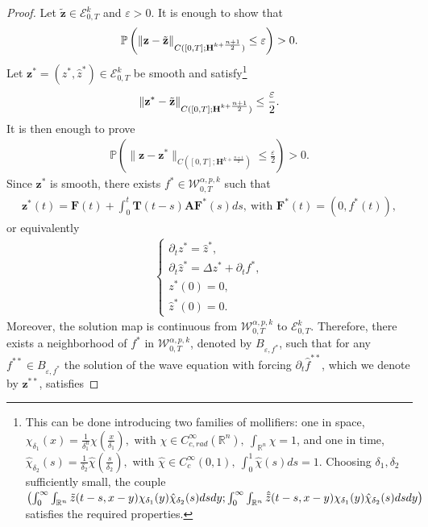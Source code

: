 \documentclass[12pt,reqno]{amsart}
\theoremstyle{plain}
\theoremstyle{remark}
\theoremstyle{plain}
\theoremstyle{definition}
\numberwithin{equation}{section}
\numberwithin{equation}{section}
\def\R{{\mathbb R}}
\newcommand{\eps}{\varepsilon}
\begin{document}
	\begin{proof}
		Let $\tilde{\mathbf{z}} \in \mathcal{E}_{0,T}^k$ and $\varepsilon > 0$. It is enough to show that
		\begin{align*}
			\mathbb{P}\left(\lVert \mathbf{z}-\Tilde{\mathbf{z}}\rVert_{C([0,T];\mathbf{H}^{k+\frac{n+1}{2}})}\leq \eps\right)>0.
		\end{align*}
		Let $\mathbf{z}^* = (z^*, \hat{z}^*) \in \mathcal{E}_{0,T}^k$ be smooth and satisfy\footnote{This can be done introducing two families of mollifiers: one in space, $\chi_{\delta_1}(x)=\frac{1}{\delta_1^n}\chi(\frac{x}{\delta_1}),$ with $ \chi\in C^{\infty}_{c,rad}(\R^n),\ \int_{\R^n}\chi=1$, and one in time, $\hat{\chi}_{\delta_2}(s)=\frac{1}{\delta_2}\hat\chi(\frac{s}{\delta_2}),$ with $\hat\chi\in C^{\infty}_c(0,1),\ \int_0^1 \hat{\chi}(s)ds=1.$ Choosing $\delta_1, \delta_2$ sufficiently small, the couple $\left(\int_0^{\infty}\int_{\R^n} \Tilde{z}(t-s,x-y)\chi_{\delta_1}(y)\hat{\chi}_{\delta_2}(s)ds dy;\int_0^{\infty}\int_{\R^n} \hat{\Tilde{z}}(t-s,x-y)\chi_{\delta_1}(y)\hat{\chi}_{\delta_2}(s)ds dy\right)$ satisfies the required properties.}
        \begin{align*}
			\lVert {\mathbf{z}}^*-\Tilde{\mathbf{z}}\rVert_{C([0,T];\mathbf{H}^{k+\frac{n+1}{2}})}\leq \frac{\eps}{2}.    
		\end{align*}
        It is then enough to prove
		\begin{align*}
			\mathbb{P}\left(\lVert \mathbf{z}-{\mathbf{z}}^*\rVert_{C([0,T];\mathbf{H}^{k+\frac{n+1}{2}})}\leq \frac{\eps}{2}\right)>0.
		\end{align*}
		Since $\mathbf{z}^*$ is smooth, there exists $f^* \in \mathcal{W}_{0,T}^{\alpha,p,k}$ such that \begin{align*}
			{\mathbf{z}}^*(t)=\mathbf{F}(t)+\int_0^t \mathbf{T}(t-s)\mathbf{A}\mathbf{F}^*(s)ds,\ \text{with } \mathbf{F}^*(t)=(0,f^*(t)),
		\end{align*} 
		or equivalently
		\begin{align*}
			\begin{cases}
				\partial_t z^*=\hat{z}^*, \\
				\partial_t \hat{z}^*= \Delta z^*+\partial_t f^*,\\
				z^*(0)=0,\\
				\hat{z}^*(0)=0.
			\end{cases}
		\end{align*}
		Moreover, the solution map is continuous from $\mathcal{W}_{0,T}^{\alpha,p,k}$ to $\mathcal{E}^k_{0,T}$.
		Therefore, there exists a neighborhood of $f^*$ in $\mathcal{W}^{\alpha,p,k}_{0,T}$, denoted by $B_{\eps,f^*}$, such that for any ${f}^{**}\in B_{\eps,f^*} $ the solution of the wave equation with forcing $\partial_t\hat f^{**}$, which we denote by $\mathbf{z}^{**}$, satisfies

\end{proof}
\end{document}
